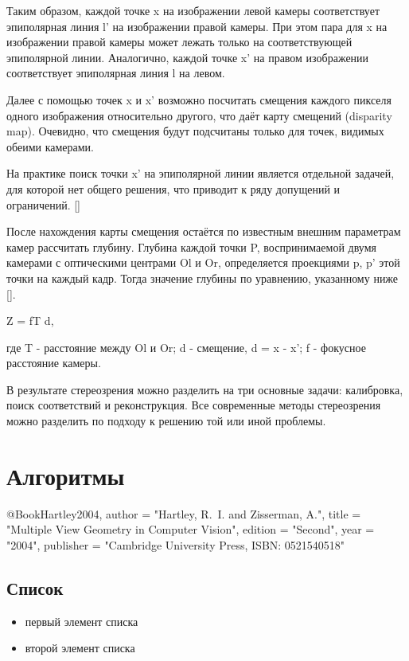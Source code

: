 Таким образом, каждой точке x на изображении левой камеры соответствует эпиполярная линия l' на изображении правой камеры. При этом пара для x на 
изображении правой камеры может лежать только на соответствующей эпиполярной линии. Аналогично, каждой точке x' на правом изображении соответствует 
эпиполярная линия l на левом.

Далее с помощью точек x и x' возможно посчитать смещения каждого пикселя одного изображения относительно другого, что даёт карту смещений (disparity map). 
Очевидно, что смещения будут подсчитаны только для точек, видимых обеими камерами. 

На практике поиск точки x' на эпиполярной линии является отдельной задачей, для которой нет общего решения, что приводит к ряду допущений и ограничений. []

После нахождения карты смещения остаётся по известным внешним параметрам камер рассчитать глубину. Глубина каждой точки P, воспринимаемой двумя камерами 
с оптическими центрами Ol и Or, определяется проекциями p, p' этой точки на каждый кадр. Тогда значение глубины по уравнению, указанному ниже []. 

Z = f{T \over d},

где T - расстояние между Ol и Or;
    d - смещение,  {d = x - x'};
	f - фокусное расстояние камеры.

В результате стереозрения можно разделить на три основные задачи: калибровка, поиск соответствий и реконструкция. Все современные методы стереозрения можно  
разделить по подходу к решению той или иной проблемы. 

\section{Алгоритмы}



@Book{Hartley2004,
    author = "Hartley, R.~I. and Zisserman, A.",
    title = "Multiple View Geometry in Computer Vision",
    edition = "Second",
    year = "2004",
    publisher = "Cambridge University Press, ISBN: 0521540518"
}

\subsection{Список}

\begin{itemize}
\item первый элемент списка
\item второй элемент списка
\end{itemize}


